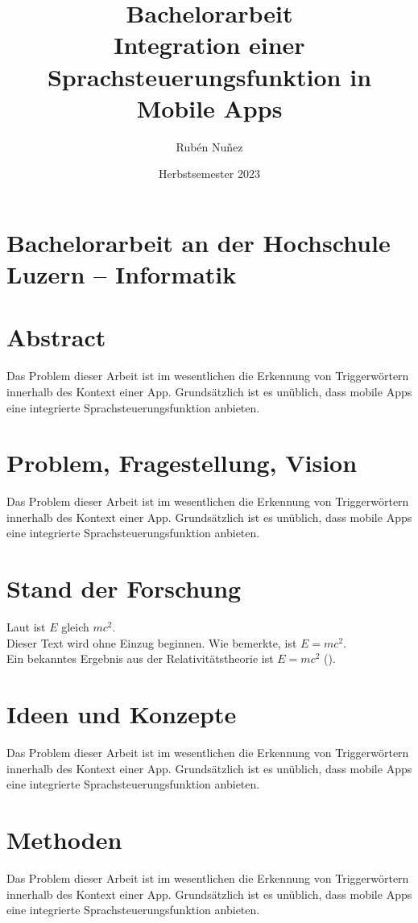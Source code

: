 \documentclass[11pt,a4paper]{article}
\title{
    {\LARGE Bachelorarbeit}\\[2em]
    {\textbf{Integration einer Sprachsteuerungsfunktion {\break} in Mobile Apps}}
}
\author{Rubén Nuñez}
\date{Herbstsemester 2023}
\begin{document}
\maketitle
\thispagestyle{empty} %
\newpage

\section*{Bachelorarbeit an der Hochschule Luzern -- Informatik}

\newpage


\section*{Abstract}
Das Problem dieser Arbeit ist im wesentlichen die Erkennung von Triggerwörtern innerhalb
des Kontext einer App. Grundsätzlich ist es unüblich, dass mobile Apps eine
integrierte Sprachsteuerungsfunktion anbieten.

\newpage
\tableofcontents

\newpage
\section{Problem, Fragestellung, Vision}
Das Problem dieser Arbeit ist im wesentlichen die Erkennung von Triggerwörtern innerhalb
des Kontext einer App. Grundsätzlich ist es unüblich, dass mobile Apps eine
integrierte Sprachsteuerungsfunktion anbieten.

\newpage
\section{Stand der Forschung}
Laut \textcite{einstein1905} ist $E$ gleich $mc^2$. \\
\noindent Dieser Text wird ohne Einzug beginnen.
Wie \textcite{einstein1905} bemerkte, ist \(E=mc^2\). \\
\glqq Ein bekanntes Ergebnis aus der Relativitätstheorie ist \(E=mc^2\) (\cite{einstein1905}).\grqq


\newpage
\section{Ideen und Konzepte}
Das Problem dieser Arbeit ist im wesentlichen die Erkennung von Triggerwörtern innerhalb
des Kontext einer App. Grundsätzlich ist es unüblich, dass mobile Apps eine
integrierte Sprachsteuerungsfunktion anbieten.


\newpage
\section{Methoden}
Das Problem dieser Arbeit ist im wesentlichen die Erkennung von Triggerwörtern innerhalb
des Kontext einer App. Grundsätzlich ist es unüblich, dass mobile Apps eine
integrierte Sprachsteuerungsfunktion anbieten.
\end{document}
